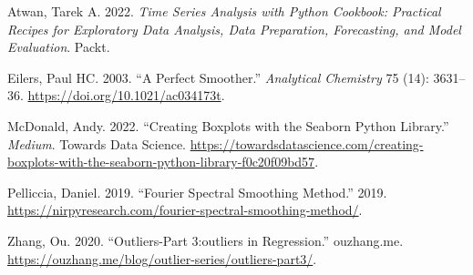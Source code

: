 \documentclass[
  letterpaper,
  DIV=11,
  numbers=noendperiod,
  oneside]{scrreprt}
\newlength{\cslhangindent}
\newlength{\cslentryspacingunit} %
\newenvironment{CSLReferences}[2] %
 {%
  \setlength{\parindent}{0pt}
  \ifodd #1
  \let\oldpar\par
  \def\par{\hangindent=\cslhangindent\oldpar}
  \fi
  \setlength{\parskip}{#2\cslentryspacingunit}
 }%
 {}
\begin{document}

\hypertarget{refs}{}
\begin{CSLReferences}{1}{0}
\leavevmode{}%
Atwan, Tarek A. 2022. \emph{Time Series Analysis with Python Cookbook:
Practical Recipes for Exploratory Data Analysis, Data Preparation,
Forecasting, and Model Evaluation}. Packt.

\leavevmode{}%
Eilers, Paul HC. 2003. {``A Perfect Smoother.''} \emph{Analytical
Chemistry} 75 (14): 3631--36. \url{https://doi.org/10.1021/ac034173t}.

\leavevmode{}%
McDonald, Andy. 2022. {``Creating Boxplots with the Seaborn Python
Library.''} \emph{Medium}. Towards Data Science.
\url{https://towardsdatascience.com/creating-boxplots-with-the-seaborn-python-library-f0c20f09bd57}.

\leavevmode{}%
Pelliccia, Daniel. 2019. {``Fourier Spectral Smoothing Method.''} 2019.
\url{https://nirpyresearch.com/fourier-spectral-smoothing-method/}.

\leavevmode{}%
Zhang, Ou. 2020. {``Outliers-Part 3:outliers in Regression.''}
ouzhang.me.
\url{https://ouzhang.me/blog/outlier-series/outliers-part3/}.

\end{CSLReferences}
\end{document}
